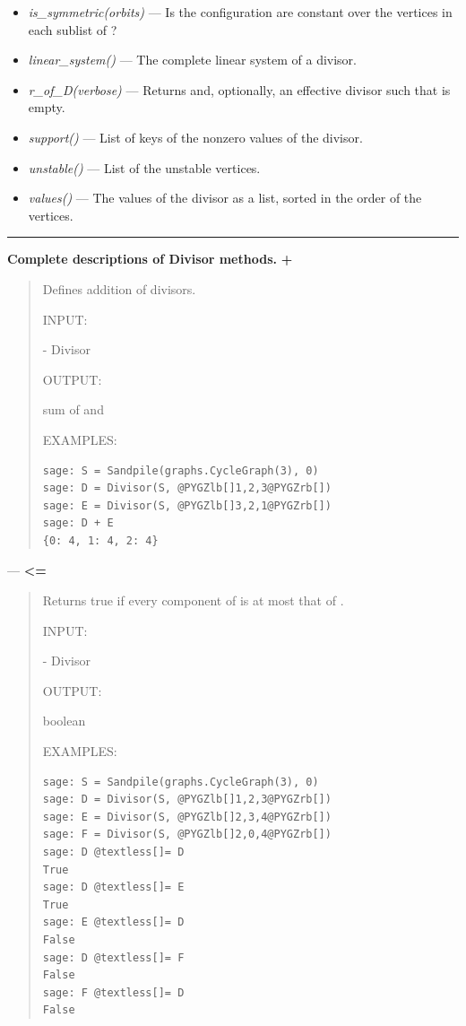 \documentclass[letterpaper,10pt,english]{manual}
\begin{document}
\begin{itemize}
\item {} 
\emph{is\_symmetric(orbits)} --- Is the configuration are constant over the vertices in each sublist of ?

\item {} 
\emph{linear\_system()} --- The complete linear system of a divisor.

\item {} 
\emph{r\_of\_D(verbose)} --- Returns  and,
optionally, an effective divisor  such that  is empty.

\item {} 
\emph{support()} --- List of keys of the nonzero values of the divisor.

\item {} 
\emph{unstable()} --- List of the unstable vertices.

\item {} 
\emph{values()} --- The values of the divisor as a list,
sorted in the order of the vertices.

\end{itemize}


\bigskip\hrule{}\bigskip


\textbf{Complete descriptions of Divisor methods.}
\hypertarget{id12}{}
\textbf{+}
\begin{quote}

Defines addition of divisors.

INPUT:

 - Divisor

OUTPUT:

sum of  and 

EXAMPLES:

\begin{Verbatim}[commandchars=@\[\]]
sage: S = Sandpile(graphs.CycleGraph(3), 0)
sage: D = Divisor(S, @PYGZlb[]1,2,3@PYGZrb[])
sage: E = Divisor(S, @PYGZlb[]3,2,1@PYGZrb[])
sage: D + E
{0: 4, 1: 4, 2: 4}
\end{Verbatim}
\end{quote}

---
\hypertarget{less-equal-divisor}{}
\textbf{\textless{}=}
\begin{quote}

Returns true if every component of  is at most that of
.

INPUT:

 - Divisor

OUTPUT:

boolean

EXAMPLES:

\begin{Verbatim}[commandchars=@\[\]]
sage: S = Sandpile(graphs.CycleGraph(3), 0)
sage: D = Divisor(S, @PYGZlb[]1,2,3@PYGZrb[])
sage: E = Divisor(S, @PYGZlb[]2,3,4@PYGZrb[])
sage: F = Divisor(S, @PYGZlb[]2,0,4@PYGZrb[])
sage: D @textless[]= D
True
sage: D @textless[]= E
True
sage: E @textless[]= D
False
sage: D @textless[]= F
False
sage: F @textless[]= D
False
\end{Verbatim}
\end{quote}
\end{document}

